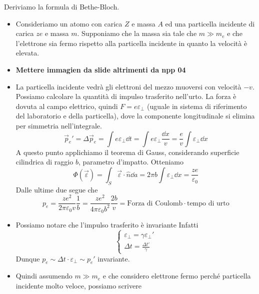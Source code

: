 Deriviamo la formula di Bethe-Bloch.
\begin{itemize}
    \item Consideriamo un atomo con carica $Z$ e massa $A$ ed una particella incidente di carica $ze$ e massa $m$. Supponiamo che la massa sia tale che $m\gg m_e$ e che l'elettrone sia fermo rispetto alla particella incidente in quanto la velocità è elevata.
    \item \textbf{Mettere immagien da slide altrimenti da npp 04}
    \item La particella incidente vedrà gli elettroni del mezzo muoversi con velocità $-v$. Possiamo calcolare la quantità di impulso trasferito nell'urto. La forza è dovuta al campo elettrico, quindi $F=e\varepsilon_\perp$ (uguale in sistema di riferimento del laboratorio e della particella), dove la componente longitudinale si elimina per simmetria nell'integrale.
    \begin{equation*}
        \vec{p}_e'= \Delta \vec{p}_e=\int e \varepsilon_\perp \dd{t}=\int e\varepsilon_\perp \frac{\dd{x}}{v}=\frac e v \int \varepsilon_\perp \dd{x}
    \end{equation*}
    A questo punto applichiamo il teorema di Gauss, considerando superficie cilindrica di raggio $b$, parametro d'impatto. Otteniamo 
    \begin{equation*}
        \Phi(\vec\varepsilon)=\int_S\vec\varepsilon\cdot\hat n \dd{a}=2\pi b\int\varepsilon_\perp\dd{x}=\frac{ze}{\varepsilon_0}   
    \end{equation*}
    Dalle ultime due segue che
    \begin{equation*}
        p_e=\frac{ze^2}{2\pi\varepsilon_0 v}\frac1 b=\frac{ze^2}{4\pi\varepsilon_0 b^2}\frac{2b}{v}=\text{Forza di Coulomb}\cdot \text{tempo di urto}
    \end{equation*}
    \item Possiamo notare che l'impulso trasferito è invariante Infatti
    \begin{equation*}
        \begin{cases}
            \varepsilon_\perp=\gamma \varepsilon_\perp'\\
            \Delta t=\frac{\Delta t'}{\gamma}
        \end{cases} 
    \end{equation*}
    Dunque $p_e\sim \Delta t\cdot\varepsilon_\perp\sim p_e'$ invariante.
    \item Quindi assumendo $m\gg m_e$ e che considero elettrone fermo perché particella incidente molto veloce, possiamo scrivere 

\end{itemize}
